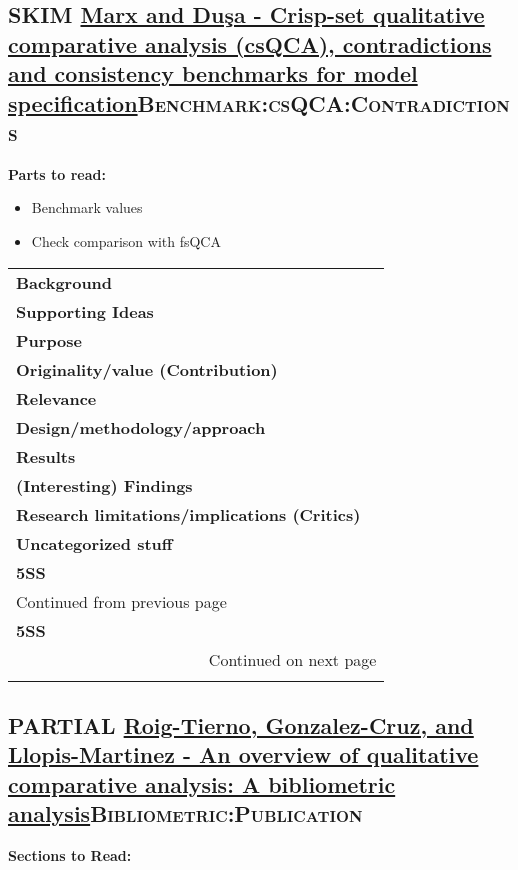 \documentclass[11pt]{article}
\begin{document}
\subsection*{{\bfseries\sffamily SKIM} \href{https://doi.org/10.4256\%2Fmio.2010.0037}{Marx and Duşa - Crisp-set qualitative comparative analysis (csQCA), contradictions and consistency benchmarks for model specification}\hfill{}\textsc{Benchmark:csQCA:Contradictions}}
\label{sec:orged6988c}
\textbf{Parts to read:}

\begin{itemize}
\item Benchmark values
\item Check comparison with fsQCA
\end{itemize}


\begin{longtable}{l|p{}}
\hline
\hline
\textbf{Background} & \\
\textbf{Supporting Ideas} & \\
\textbf{Purpose} & \\
\textbf{Originality/value (Contribution)} & \\
\textbf{Relevance} & \\
\textbf{Design/methodology/approach} & \\
\textbf{Results} & \\
\textbf{(Interesting) Findings} & \\
\textbf{Research limitations/implications (Critics)} & \\
\textbf{Uncategorized stuff} & \\
\textbf{5SS} & \\
\hline
\endfirsthead
\multicolumn{2}{l}{Continued from previous page} \\

\textbf{5SS} &  \\

\hline
\endhead
\hline\multicolumn{2}{r}{Continued on next page} \\
\endfoot
\endlastfoot
\hline
\hline
\end{longtable}

\subsection*{{\bfseries\sffamily PARTIAL} \href{https://www.sciencedirect.com/science/article/pii/S2444569X16300257}{Roig-Tierno, Gonzalez-Cruz, and Llopis-Martinez -  An overview of qualitative comparative analysis: A bibliometric analysis}\hfill{}\textsc{Bibliometric:Publication}}
\label{sec:orgf4c6744}
\textbf{Sections to Read:}
\end{document}
